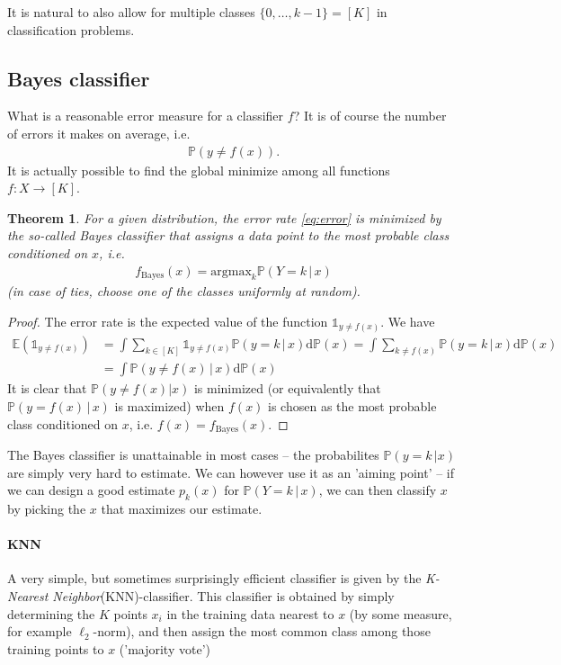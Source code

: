 \documentclass{article}
\newcommand{\erw}{\mathbb{E}} %
\newtheorem{theorem}{Theorem}
\newcommand{\one}{\mathds{1}}
\begin{document}
It is natural to also allow for multiple classes $\{0,\dots, k-1\}=[K]$ in classification problems.

\subsection{Bayes classifier} What is a reasonable error measure for a classifier $f$?  It is of course the number of errors it makes on average, i.e.
\begin{align} \label{eq:error}
    \mathbb{P}(y\neq f(x)).
\end{align}
It is actually possible to find the global minimize among all functions $f:X\to [K]$.
\begin{theorem}
    For a given distribution, the error rate \eqref{eq:error} is minimized by the so-called \emph{Bayes classifier} that assigns a data point to the most probable class conditioned on $x$, i.e.
    \begin{align*}
        f_{\mathrm{Bayes}}(x) = \mathrm{argmax}_k \mathbb{P}(Y=k \, \vert \, x)
    \end{align*}
    (in case of ties, choose one of the classes uniformly at random).
\end{theorem}
\begin{proof}
    The error rate is the expected value of the function $\one_{y \neq f(x)}$. We have
    \begin{align*}
        \erw(\one_{y\neq f(x)}) &= \int \sum_{k\in [K]} \one_{y\neq f(x)} \mathbb{P}(y=k \, \vert \, x) \mathrm{d}\mathbb{P}(x) = \int \sum_{k\neq f(x)}  \mathbb{P}(y=k \, \vert \, x) \mathrm{d}\mathbb{P}(x) \\
        &= \int  \mathbb{P}(y\neq f(x) \, \vert \, x) \mathrm{d}\mathbb{P}(x) 
    \end{align*}
    It is clear that $\mathbb{P}(y\neq f(x) \vert x)$ is minimized (or equivalently that $\mathbb{P}(y=f(x) \, \vert \, x)$ is maximized) when $f(x)$ is chosen as the most probable class conditioned on $x$, i.e. $f(x)=f_{\mathrm{Bayes}}(x)$.
\end{proof}
The Bayes classifier is unattainable in most cases -- the probabilites $\mathbb{P}(y=k \, \vert x)$ are simply very hard to estimate. We can however use it as an 'aiming point' -- if we can design a good estimate $p_k(x)$ for $\mathbb{P}(Y=k\, \vert \, x)$, we can then classify $x$ by picking the $x$ that maximizes our estimate.

\paragraph{KNN} A very simple, but sometimes surprisingly efficient classifier is given by the \emph{K-Nearest Neighbor}(KNN)-classifier. This classifier is obtained by simply determining the $K$ points $x_i$ in the training data nearest to $x$ (by some measure, for example $\ell_2$-norm), and then assign the most common class among those training points to $x$ ('majority vote')
\end{document}
